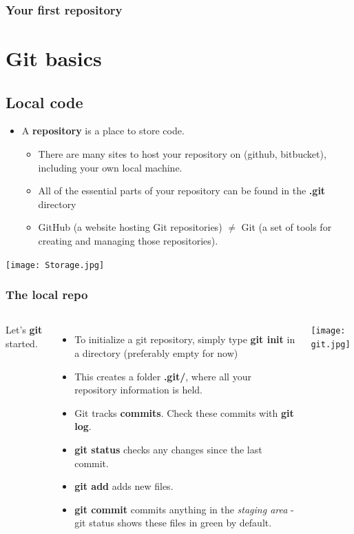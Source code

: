 \documentclass{beamer}
\begin{document}
\begin{frame}[fragile]
\frametitle{Your first repository}

\section{Git basics}

\subsection{Local code}

\begin{itemize}
\item A \textbf{repository} is a place to store code.
\begin{itemize}
\item There are many sites to host your repository on (github, bitbucket), including your own local machine.
\item All of the essential parts of your repository can be found in the \textbf{.git} directory
\item GitHub (a website hosting Git repositories) $\neq$ Git (a set of tools for creating and managing those repositories).
\end{itemize}

\end{itemize}

\texttt{[image: Storage.jpg]}

\end{frame}

\begin{frame}[fragile]
\frametitle{The local repo}
\begin{columns}
Let's \textbf{git} started.
\begin{itemize}
\item To initialize a git repository, simply type \textbf{git init} in a directory (preferably empty for now)
\item This creates a folder \textbf{.git/}, where all your repository information is held.
\item Git tracks \textbf{commits}. Check these commits with \textbf{git log}.
\item \textbf{git status} checks any changes since the last commit.
\item \textbf{git add} adds new files.
\item \textbf{git commit} commits anything in the \textit{staging area} - git status shows these files in {\color{dkgreen}green} by default.
\end{itemize}
\texttt{[image: git.jpg]}
\end{columns}
\end{frame}
\end{document}
